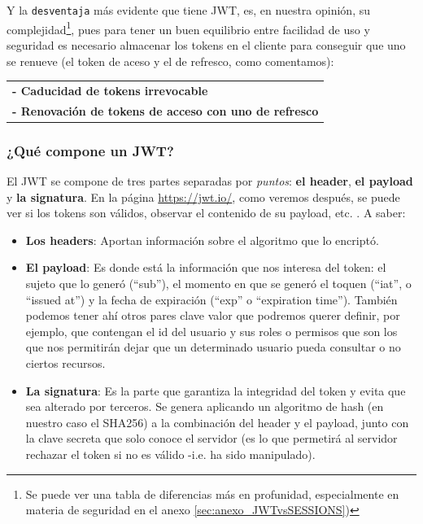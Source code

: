 \documentclass[a4paper,12pt]{report}
\begin{document}
				   \noindent Y la \texttt{desventaja} más evidente que tiene JWT, es, en nuestra opinión, su complejidad\footnote{Se puede ver una tabla de diferencias más en profunidad, especialmente en materia de seguridad en el anexo \ref{sec:anexo_JWTvsSESSIONS})}, pues para tener un buen equilibrio entre facilidad de uso y seguridad es necesario almacenar los tokens en el cliente para conseguir que uno se renueve (el token de aceso y el de refresco, como comentamos):
				  
				  \begin{tabular}{l}
					 \textbf{- Caducidad de tokens irrevocable}\\
					 \textbf{- Renovación de tokens de acceso con uno de refresco}
				  \end{tabular}
				 

				
				
				
				\subsubsection{¿Qué compone un JWT?}
				\label{sec:queComponeJWTbackend}
				
				\noindent El JWT se compone de tres partes separadas por \textit{puntos}: \textbf{el header}, \textbf{el payload} y \textbf{la signatura}. En la página \href{https://jwt.io/}{https://jwt.io/}, como veremos después, se puede ver si los tokens son válidos, observar el contenido de su payload, etc. \cite{jwtio}. A saber:
				

				\begin{itemize}
					\setlength{\itemsep}{-.5em}
					\item 				\textbf{Los headers}: Aportan información sobre el algoritmo que lo encriptó.
					\item 				\textbf{El payload}: Es donde está la información que nos interesa del token: el sujeto que lo generó (``sub''), el momento en que se generó el toquen (``iat'', o ``issued at'') y la fecha de expiración (``exp'' o ``expiration time''). También podemos tener ahí otros pares clave valor que podremos querer definir, por ejemplo, que contengan el id del usuario y sus roles o permisos que son los que nos permitirán dejar que un determinado usuario pueda consultar o no ciertos recursos.
					
					\item \textbf{La signatura}: Es la parte que garantiza la integridad del token y evita que sea alterado por terceros. Se genera aplicando un algoritmo de hash (en nuestro caso el SHA256) a la combinación del header y el payload, junto con la clave secreta que solo conoce el servidor (es lo que permetirá al servidor rechazar el token si no es válido -i.e. ha sido manipulado).
				\end{itemize}
				
\end{document}
